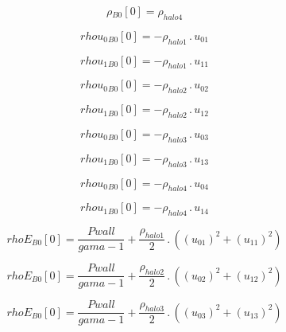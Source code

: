 \documentclass{article}
\begin{document}
\begin{dmath}{\rho{_{B0}}}[{0}] = \rho_{halo 4}\end{dmath}

\begin{dmath}{rhou_{0}{_{B0}}}[{0}] = - \rho_{halo 1} \,.\, u_{01}\end{dmath}

\begin{dmath}{rhou_{1}{_{B0}}}[{0}] = - \rho_{halo 1} \,.\, u_{11}\end{dmath}

\begin{dmath}{rhou_{0}{_{B0}}}[{0}] = - \rho_{halo 2} \,.\, u_{02}\end{dmath}

\begin{dmath}{rhou_{1}{_{B0}}}[{0}] = - \rho_{halo 2} \,.\, u_{12}\end{dmath}

\begin{dmath}{rhou_{0}{_{B0}}}[{0}] = - \rho_{halo 3} \,.\, u_{03}\end{dmath}

\begin{dmath}{rhou_{1}{_{B0}}}[{0}] = - \rho_{halo 3} \,.\, u_{13}\end{dmath}

\begin{dmath}{rhou_{0}{_{B0}}}[{0}] = - \rho_{halo 4} \,.\, u_{04}\end{dmath}

\begin{dmath}{rhou_{1}{_{B0}}}[{0}] = - \rho_{halo 4} \,.\, u_{14}\end{dmath}

\begin{dmath}{rhoE{_{B0}}}[{0}] = \frac{Pwall}{gama - 1} + \frac{\rho_{halo 1}}{2} \,.\, \left(\left(u_{01} \right)^{2} + \left(u_{11} \right)^{2}\right)\end{dmath}

\begin{dmath}{rhoE{_{B0}}}[{0}] = \frac{Pwall}{gama - 1} + \frac{\rho_{halo 2}}{2} \,.\, \left(\left(u_{02} \right)^{2} + \left(u_{12} \right)^{2}\right)\end{dmath}

\begin{dmath}{rhoE{_{B0}}}[{0}] = \frac{Pwall}{gama - 1} + \frac{\rho_{halo 3}}{2} \,.\, \left(\left(u_{03} \right)^{2} + \left(u_{13} \right)^{2}\right)\end{dmath}
\end{document}
